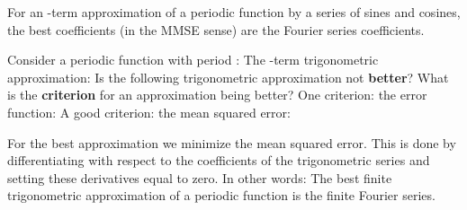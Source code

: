 \EMhold


\begin{EMtheorem}{}

For an -term approximation of a periodic function  by a series of sines and cosines, the best coefficients (in the MMSE sense) are the Fourier series coefficients.

\end{EMtheorem}

Consider a periodic function with period \EMim{2\pi}:
The -term trigonometric approximation:
Is the following trigonometric approximation not \textbf{better}?
What is the \textbf{criterion} for an approximation being better? One criterion: the error function:
A good criterion: the mean squared error:

\begin{EMproof}{}

For the best approximation we minimize the mean squared error. This is done by differentiating  with respect to the coefficients of the trigonometric series and setting these derivatives equal to zero. In other words:
The best finite trigonometric approximation of a periodic function is the finite Fourier series.

\end{EMproof}

